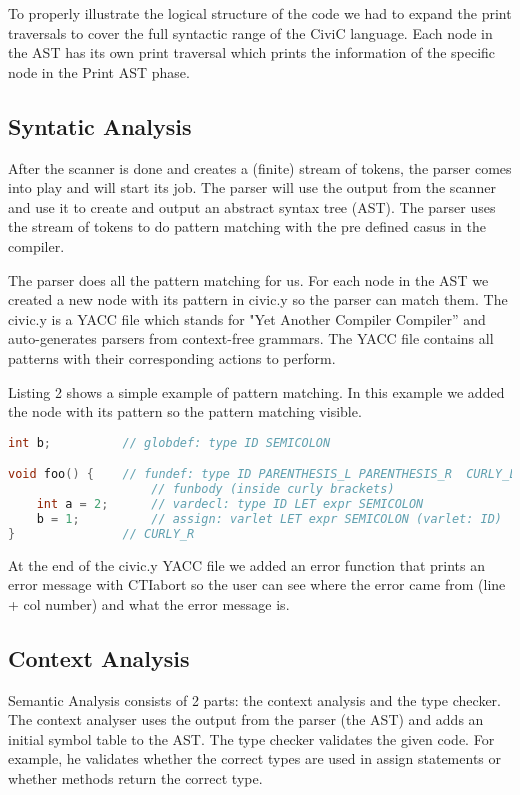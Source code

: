 \documentclass[hidelinks]{uva-inf-article}
\begin{document}
To properly illustrate the logical structure of the code we had to expand the print traversals
to cover the full syntactic range of the CiviC language. Each node in the AST has its own
print traversal which prints the information of the specific node in the Print AST phase.

\newpage
\subsection{Syntatic Analysis}
After the scanner is done and creates a (finite) stream of tokens, the parser comes
into play and will start its job. The parser will use the output from the scanner and
use it to create and output an abstract syntax tree (AST). The parser uses the stream 
of tokens to do pattern matching with the pre defined casus in the compiler. 

The parser does all the pattern matching for us. For each node in the AST we created 
a new node with its pattern in civic.y so the parser can match them. The civic.y is a
YACC file which stands for "Yet Another Compiler Compiler” and auto-generates parsers
from context-free grammars. The YACC file contains all patterns with their corresponding
actions to perform.

Listing 2 shows a simple example of pattern matching. In this example we added the
node with its pattern so the pattern matching visible. 

\begin{lstlisting}[basicstyle=\small, language=C, label=lst:code-2, caption=Pattern matching Example, captionpos=b]
int b;          // globdef: type ID SEMICOLON

void foo() {    // fundef: type ID PARENTHESIS_L PARENTHESIS_R  CURLY_L
                    // funbody (inside curly brackets)
    int a = 2;      // vardecl: type ID LET expr SEMICOLON
    b = 1;          // assign: varlet LET expr SEMICOLON (varlet: ID)
}               // CURLY_R 
\end{lstlisting}

At the end of the civic.y YACC file we added an error function that prints an error message
with CTIabort so the user can see where the error came from (line + col number) and what
the error message is. 

\subsection{Context Analysis}
Semantic Analysis consists of 2 parts: the context analysis and the type checker. The context
analyser uses the output from the parser (the AST) and adds an initial symbol table to the AST.
The type checker validates the given code. For example, he validates whether the correct 
types are used in assign statements or whether methods return the correct type.
\end{document}
